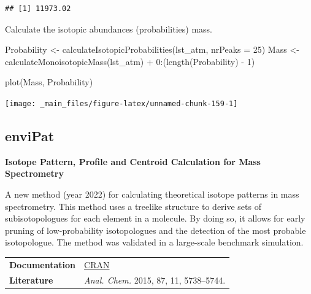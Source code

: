 \documentclass[
]{book}
\newenvironment{Shaded}{\begin{snugshade}}{\end{snugshade}}
\newcommand{\AttributeTok}[1]{\textcolor[rgb]{0.77,0.63,0.00}{#1}}
\newcommand{\DecValTok}[1]{\textcolor[rgb]{0.00,0.00,0.81}{#1}}
\newcommand{\FunctionTok}[1]{\textcolor[rgb]{0.00,0.00,0.00}{#1}}
\newcommand{\NormalTok}[1]{#1}
\newcommand{\OtherTok}[1]{\textcolor[rgb]{0.56,0.35,0.01}{#1}}
\newcommand{\SpecialCharTok}[1]{\textcolor[rgb]{0.00,0.00,0.00}{#1}}
\begin{document}
\begin{verbatim}
## [1] 11973.02
\end{verbatim}

Calculate the isotopic abundances (probabilities) mass.

\begin{Shaded}
\begin{Highlighting}[]
\NormalTok{Probability }\OtherTok{\textless{}{-}} \FunctionTok{calculateIsotopicProbabilities}\NormalTok{(lst\_atm, }\AttributeTok{nrPeaks =} \DecValTok{25}\NormalTok{)}
\NormalTok{Mass }\OtherTok{\textless{}{-}} \FunctionTok{calculateMonoisotopicMass}\NormalTok{(lst\_atm) }\SpecialCharTok{+} \DecValTok{0}\SpecialCharTok{:}\NormalTok{(}\FunctionTok{length}\NormalTok{(Probability) }\SpecialCharTok{{-}} \DecValTok{1}\NormalTok{)}

\FunctionTok{plot}\NormalTok{(Mass, Probability)}
\end{Highlighting}
\end{Shaded}

\begin{center}\texttt{[image: \_main\_files/figure-latex/unnamed-chunk-159-1]} \end{center}

\hypertarget{envipat}{%
\subsection{enviPat}\label{envipat}}

\textbf{Isotope Pattern, Profile and Centroid Calculation for Mass Spectrometry}

A new method (year 2022) for calculating theoretical isotope patterns in mass spectrometry. This method uses a treelike structure to derive sets of subisotopologues for each element in a molecule. By doing so, it allows for early pruning of low-probability isotopologues and the detection of the most probable isotopologue. The method was validated in a large-scale benchmark simulation.

\begin{longtable}[]{@{}
  >{\raggedright\arraybackslash}p{}
  >{\raggedright\arraybackslash}p{}@{}}
\toprule\noalign{}
\endhead
\bottomrule\noalign{}
\endlastfoot
\textbf{Documentation} & \href{https://cran.r-project.org/web/packages/enviPat/enviPat.pdf}{CRAN} \\
\textbf{Literature} & \emph{Anal. Chem.} 2015, 87, 11, 5738--5744. \\
\end{longtable}
\end{document}
